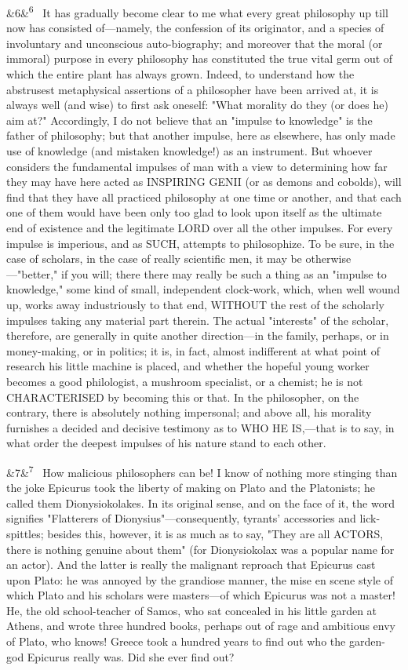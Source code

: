 \documentclass[12pt]{article}
\newcommand{\para}[1][]{\par\noindent\ifx&#1&\else\textsuperscript{\footnotesize #1}~\fi}
\begin{document}
\para[6] It has gradually become clear to me what every great philosophy up till now has consisted of---namely, the confession of its originator, and a species of involuntary and unconscious auto-biography; and moreover that the moral (or immoral) purpose in every philosophy has constituted the true vital germ out of which the entire plant has always grown. Indeed, to understand how the abstrusest metaphysical assertions of a philosopher have been arrived at, it is always well (and wise) to first ask oneself: "What morality do they (or does he) aim at?" Accordingly, I do not believe that an "impulse to knowledge" is the father of philosophy; but that another impulse, here as elsewhere, has only made use of knowledge (and mistaken knowledge!) as an instrument. But whoever considers the fundamental impulses of man with a view to determining how far they may have here acted as INSPIRING GENII (or as demons and cobolds), will find that they have all practiced philosophy at one time or another, and that each one of them would have been only too glad to look upon itself as the ultimate end of existence and the legitimate LORD over all the other impulses. For every impulse is imperious, and as SUCH, attempts to philosophize. To be sure, in the case of scholars, in the case of really scientific men, it may be otherwise---"better," if you will; there there may really be such a thing as an "impulse to knowledge," some kind of small, independent clock-work, which, when well wound up, works away industriously to that end, WITHOUT the rest of the scholarly impulses taking any material part therein. The actual "interests" of the scholar, therefore, are generally in quite another direction---in the family, perhaps, or in money-making, or in politics; it is, in fact, almost indifferent at what point of research his little machine is placed, and whether the hopeful young worker becomes a good philologist, a mushroom specialist, or a chemist; he is not CHARACTERISED by becoming this or that. In the philosopher, on the contrary, there is absolutely nothing impersonal; and above all, his morality furnishes a decided and decisive testimony as to WHO HE IS,---that is to say, in what order the deepest impulses of his nature stand to each other.

\para[7] How malicious philosophers can be! I know of nothing more stinging than the joke Epicurus took the liberty of making on Plato and the Platonists; he called them Dionysiokolakes. In its original sense, and on the face of it, the word signifies "Flatterers of Dionysius"---consequently, tyrants' accessories and lick-spittles; besides this, however, it is as much as to say, "They are all ACTORS, there is nothing genuine about them" (for Dionysiokolax was a popular name for an actor). And the latter is really the malignant reproach that Epicurus cast upon Plato: he was annoyed by the grandiose manner, the mise en scene style of which Plato and his scholars were masters---of which Epicurus was not a master! He, the old school-teacher of Samos, who sat concealed in his little garden at Athens, and wrote three hundred books, perhaps out of rage and ambitious envy of Plato, who knows! Greece took a hundred years to find out who the garden-god Epicurus really was. Did she ever find out?
\end{document}
